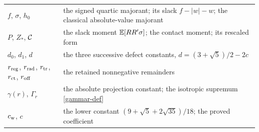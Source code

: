 \begin{longtable}{@{}p{} p{}@{}}
$f$, $\sigma$, $h_0$ & the signed quartic majorant; its slack $f-|w|-w$; the classical absolute-value majorant \\
$P$, $Z_*$, $\cal C$ & the slack moment $\mathbb E[RR'\sigma]$; the contact moment; its rescaled form \\
$d_0$, $d_1$, $d$ & the three successive defect constants, $d=(3+\sqrt5)/2-2c$ \\
$r_{\rm reg}$, $r_{\rm rad}$, $r_{\rm tr}$, $r_{\rm ct}$, $r_{\rm off}$ & the retained nonnegative remainders \\
$\gamma(r)$, $\Gamma_r$ & the absolute projection constant; the isotropic supremum \eqref{gammar-def} \\
$c_{\mathrm{w}}$, $c$ & the lower constant $(9+\sqrt5+2\sqrt{35})/18$; the proved coefficient \\
\bottomrule
\end{longtable}
